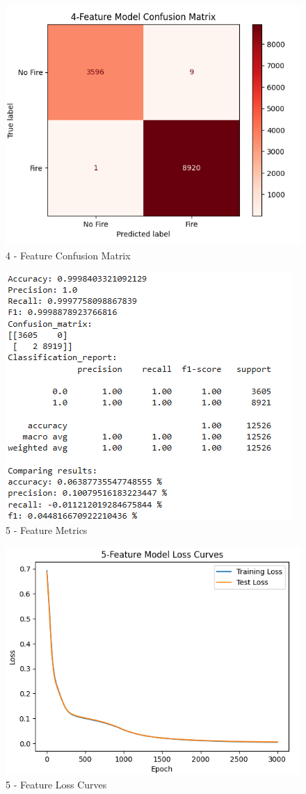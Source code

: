 \documentclass[conference]{IEEEtran}
\begin{document}
\begin{figure}
    \centering
    \includegraphics[width=0.75\linewidth]{images/4CM.png}
    \caption{4 - Feature Confusion Matrix}
    \label{fig:3.2}
\end{figure}

\begin{figure}
    \centering
    \includegraphics[width=0.75\linewidth]{images/5metric.png}
    \caption{5 - Feature Metrics}
    \label{fig:4.0}
\end{figure}

\begin{figure}
    \centering
    \includegraphics[width=0.75\linewidth]{images/5LC.png}
    \caption{5 - Feature Loss Curves}
    \label{fig:4.1}
\end{figure}
\end{document}
